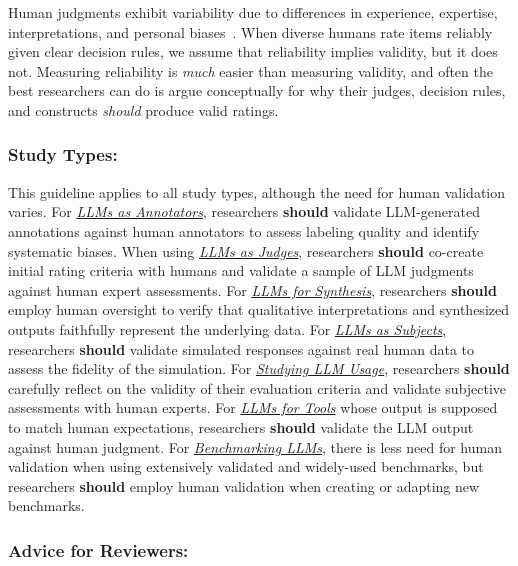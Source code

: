 \documentclass[smallextended]{svjour3}
\newcommand{\should}{\textbf{should}\xspace}
\newcommand{\annotators}{\hyperref[sec:llms-as-annotators]{\emph{LLMs as Annotators}}\xspace}
\newcommand{\judges}{\hyperref[sec:llms-as-judges]{\emph{LLMs as Judges}}\xspace}
\newcommand{\synthesis}{\hyperref[sec:llms-for-synthesis]{\emph{LLMs for Synthesis}}\xspace}
\newcommand{\subjects}{\hyperref[sec:llms-as-subjects]{\emph{LLMs as Subjects}}\xspace}
\newcommand{\llmusage}{\hyperref[sec:studying-llm-usage-in-software-engineering]{\emph{Studying LLM Usage}}\xspace}
\newcommand{\newtools}{\hyperref[sec:llms-for-new-software-engineering-tools]{\emph{LLMs for Tools}}\xspace}
\newcommand{\benchmarkingtasks}{\hyperref[sec:benchmarking-llms-for-software-engineering-tasks]{\emph{Benchmarking LLMs}}\xspace}
\newcommand{\annotators}{\href{/study-types\#llms-as-annotators}{\emph{LLMs as Annotators}}\xspace}
\newcommand{\judges}{\href{/study-types\#llms-as-judges}{\emph{LLMs as Judges}}\xspace}
\newcommand{\synthesis}{\href{/study-types\#llms-for-synthesis}{\emph{LLMs for Synthesis}}\xspace}
\newcommand{\subjects}{\href{/study-types\#llms-as-subjects}{\emph{LLMs as Subjects}}\xspace}
\newcommand{\llmusage}{\href{/study-types\#studying-llm-usage-in-software-engineering}{\emph{Studying LLM Usage}}\xspace}
\newcommand{\newtools}{\href{/study-types\#llms-for-new-software-engineering-tools}{\emph{LLMs for Tools}}\xspace}
\newcommand{\benchmarkingtasks}{\href{/study-types\#benchmarking-llms-for-software-engineering-tasks}{\emph{Benchmarking LLMs}}\xspace}
\newcommand{\guidelinesubsubsection}[1]{\subsubsection{\bfseries #1:}}
\newcommand{\guidelinesubsubsection}[1]{\subsubsection{#1}}
\begin{document}
Human judgments exhibit variability due to differences in experience, expertise, interpretations, and personal biases~\cite{DBLP:journals/pacmhci/McDonaldSF19}. When diverse humans rate items reliably given clear decision rules, we assume that reliability implies validity, but it does not. Measuring reliability is \textit{much} easier than measuring validity, and often the best researchers can do is argue conceptually for why their judges, decision rules, and constructs \textit{should} produce valid ratings.

\guidelinesubsubsection{Study Types}

This guideline applies to all study types, although the need for human validation varies.
For \annotators, researchers \should validate LLM-generated annotations against human annotators to assess labeling quality and identify systematic biases.
When using \judges, researchers \should co-create initial rating criteria with humans and validate a sample of LLM judgments against human expert assessments.
For \synthesis, researchers \should employ human oversight to verify that qualitative interpretations and synthesized outputs faithfully represent the underlying data.
For \subjects, researchers \should validate simulated responses against real human data to assess the fidelity of the simulation.
For \llmusage, researchers \should carefully reflect on the validity of their evaluation criteria and validate subjective assessments with human experts.
For \newtools whose output is supposed to match human expectations, researchers \should validate the LLM output against human judgment.
For \benchmarkingtasks, there is less need for human validation when using extensively validated and widely-used benchmarks, but researchers \should employ human validation when creating or adapting new benchmarks.

\guidelinesubsubsection{Advice for Reviewers}
\end{document}

